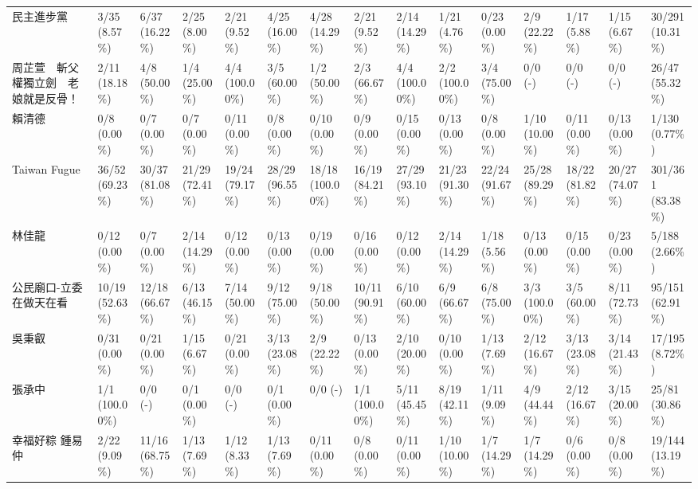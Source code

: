 \documentclass[a4paper, 10pt, conference]{ieeeconf}       %
\begin{document}
\begin{CJK}{UTF8}{bsmi}
\begin{landscape}
\begin{longtable}[c]{@{}L{2.45cm}L{1.1cm}L{1.1cm}L{1.1cm}L{1.1cm}L{1.1cm}L{1.1cm}L{1.1cm}L{1.1cm}L{1.1cm}L{1.1cm}L{1.1cm}L{1.1cm}L{1.1cm}L{1.1cm}@{}}
民主進步黨 & 3/35 (8.57\%) & 6/37 (16.22\%) & 2/25 (8.00\%) & 2/21 (9.52\%) & 4/25 (16.00\%) & 4/28 (14.29\%) & 2/21 (9.52\%) & 2/14 (14.29\%) & 1/21 (4.76\%) & 0/23 (0.00\%) & 2/9 (22.22\%) & 1/17 (5.88\%) & 1/15 (6.67\%) & 30/291 (10.31\%) \\
周芷萱　斬父權獨立劍　老娘就是反骨！ & 2/11 (18.18\%) & 4/8 (50.00\%) & 1/4 (25.00\%) & 4/4 (100.00\%) & 3/5 (60.00\%) & 1/2 (50.00\%) & 2/3 (66.67\%) & 4/4 (100.00\%) & 2/2 (100.00\%) & 3/4 (75.00\%) & 0/0 \newline (-) & 0/0 \newline (-) & 0/0 \newline (-) & 26/47 (55.32\%) \\
賴清德 & 0/8 (0.00\%) & 0/7 (0.00\%) & 0/7 (0.00\%) & 0/11 (0.00\%) & 0/8 (0.00\%) & 0/10 (0.00\%) & 0/9 (0.00\%) & 0/15 (0.00\%) & 0/13 (0.00\%) & 0/8 (0.00\%) & 1/10 (10.00\%) & 0/11 (0.00\%) & 0/13 (0.00\%) & 1/130 (0.77\%) \\
Taiwan Fugue & 36/52 (69.23\%) & 30/37 (81.08\%) & 21/29 (72.41\%) & 19/24 (79.17\%) & 28/29 (96.55\%) & 18/18 (100.00\%) & 16/19 (84.21\%) & 27/29 (93.10\%) & 21/23 (91.30\%) & 22/24 (91.67\%) & 25/28 (89.29\%) & 18/22 (81.82\%) & 20/27 (74.07\%) & 301/361 (83.38\%) \\
林佳龍 & 0/12 (0.00\%) & 0/7 (0.00\%) & 2/14 (14.29\%) & 0/12 (0.00\%) & 0/13 (0.00\%) & 0/19 (0.00\%) & 0/16 (0.00\%) & 0/12 (0.00\%) & 2/14 (14.29\%) & 1/18 (5.56\%) & 0/13 (0.00\%) & 0/15 (0.00\%) & 0/23 (0.00\%) & 5/188 (2.66\%) \\
公民廟口-立委在做天在看 & 10/19 (52.63\%) & 12/18 (66.67\%) & 6/13 (46.15\%) & 7/14 (50.00\%) & 9/12 (75.00\%) & 9/18 (50.00\%) & 10/11 (90.91\%) & 6/10 (60.00\%) & 6/9 (66.67\%) & 6/8 (75.00\%) & 3/3 (100.00\%) & 3/5 (60.00\%) & 8/11 (72.73\%) & 95/151 (62.91\%) \\
吳秉叡 & 0/31 (0.00\%) & 0/21 (0.00\%) & 1/15 (6.67\%) & 0/21 (0.00\%) & 3/13 (23.08\%) & 2/9 (22.22\%) & 0/13 (0.00\%) & 2/10 (20.00\%) & 0/10 (0.00\%) & 1/13 (7.69\%) & 2/12 (16.67\%) & 3/13 (23.08\%) & 3/14 (21.43\%) & 17/195 (8.72\%) \\
張承中 & 1/1 (100.00\%) & 0/0 (-) & 0/1 (0.00\%) & 0/0 (-) & 0/1 (0.00\%) & 0/0 (-) & 1/1 (100.00\%) & 5/11 (45.45\%) & 8/19 (42.11\%) & 1/11 (9.09\%) & 4/9 (44.44\%) & 2/12 (16.67\%) & 3/15 (20.00\%) & 25/81 (30.86\%) \\
幸福好粽 鍾易仲 & 2/22 (9.09\%) & 11/16 (68.75\%) & 1/13 (7.69\%) & 1/12 (8.33\%) & 1/13 (7.69\%) & 0/11 (0.00\%) & 0/8 (0.00\%) & 0/11 (0.00\%) & 1/10 (10.00\%) & 1/7 (14.29\%) & 1/7 (14.29\%) & 0/6 (0.00\%) & 0/8 (0.00\%) & 19/144 (13.19\%) \\

\end{longtable}
\end{landscape}
\end{CJK}
\end{document}
